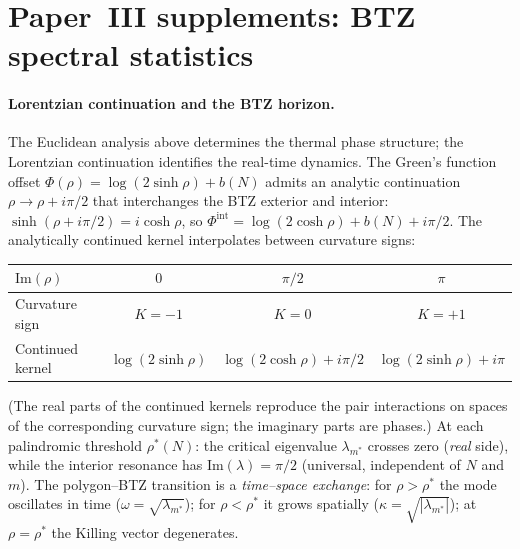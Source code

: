 \section{Paper~III supplements: BTZ spectral statistics}
\label{sec:btz-lorentzian}

\paragraph{Lorentzian continuation and the BTZ horizon.}
The Euclidean analysis above determines the thermal phase structure; the Lorentzian continuation identifies the real-time dynamics.
The Green's function offset $\Phi(\rho) = \log(2\sinh\rho) + b(N)$ admits
an analytic continuation $\rho \to \rho + i\pi/2$ that interchanges
the BTZ exterior and interior:
$\sinh(\rho + i\pi/2) = i\cosh\rho$, so
$\Phi^{\mathrm{int}} = \log(2\cosh\rho) + b(N) + i\pi/2$.
The analytically continued kernel interpolates between curvature
signs:
\begin{center}
\begin{tabular}{lccc}
\toprule
$\mathrm{Im}(\rho)$ & $0$ & $\pi/2$ & $\pi$ \\
\midrule
Curvature sign & $K{=}{-}1$ & $K{=}0$ & $K{=}{+}1$ \\
Continued kernel & $\log(2\sinh\rho)$ & $\log(2\cosh\rho) + i\pi/2$ &
  $\log(2\sinh\rho) + i\pi$ \\
\bottomrule
\end{tabular}
\end{center}
\noindent
(The real parts of the continued kernels reproduce the
pair interactions on spaces of the corresponding curvature
sign; the imaginary parts are phases.)
At each palindromic threshold $\rho^*(N)$: the critical eigenvalue
$\lambda_{m^*}$ crosses zero (\emph{real} side), while the interior
resonance has $\mathrm{Im}(\lambda) = \pi/2$ (universal, independent
of $N$ and~$m$).
The polygon--BTZ transition is a \emph{time--space exchange}:
for $\rho > \rho^*$ the mode oscillates in time
($\omega = \sqrt{\lambda_{m^*}}$); for $\rho < \rho^*$ it grows
spatially ($\kappa = \sqrt{|\lambda_{m^*}|}$);
at $\rho = \rho^*$ the Killing vector degenerates.

